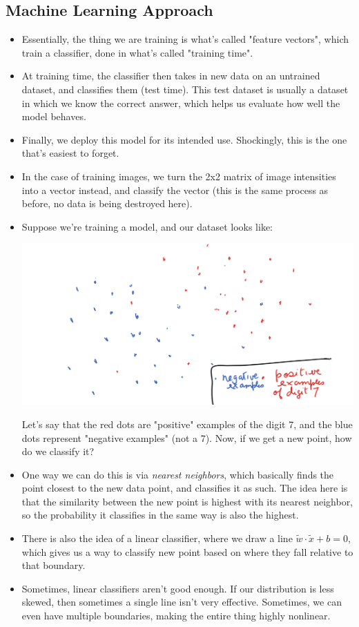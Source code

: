 \subsection{Machine Learning Approach}
\begin{itemize}
	\item Essentially, the thing we are training is what's called "feature vectors", which
		train a classifier, done in what's called "training time". 
	\item At training time, the classifier then takes in new data on an untrained 
		dataset,
		and classifies them (test time). This test dataset is usually a dataset 
		in which we
		know the correct answer, which helps us evaluate how well the model behaves. 
	\item Finally, we deploy this model for its intended use. Shockingly, 
		this is the one that's easiest to forget. 
	\item In the case of training images, we turn the 2x2 matrix of image intensities 
		into a vector instead, and classify the vector 
		(this is the same process as before, no data
		is being destroyed here). 

	\item Suppose we're training a model, and our dataset looks like:

		\begin{center}
			\includegraphics[scale=0.4]{lec-1a.png}
		\end{center}

		Let's say that the red dots are "positive" examples of the digit 7, and the 
		blue dots represent "negative examples" (not a 7). 
		Now, if we get a new point, how do
		we classify it?
	\item One way we can do this is via \textit{nearest neighbors}, which basically
		finds the point closest to the new data point, and classifies it as such. The
		idea here is that the similarity between the new point is highest with its
		nearest neighbor, so the probability it classifies in the same way is also
		the highest.
	\item There is also the idea of a linear classifier, where we draw a line \(
		\tilde w \cdot \tilde x + b = 0 \), which gives us a way to classify new
		point based on where they fall relative to that boundary.   
	\item Sometimes, linear classifiers aren't good enough. If our distribution is
		less skewed, then sometimes a single line isn't very effective. Sometimes, we
		can even have multiple boundaries, making the entire thing highly nonlinear.   
\end{itemize}
